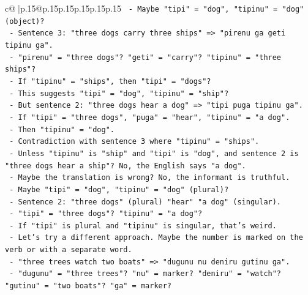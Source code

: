 \documentclass{article}
\begin{document}
{\begin{supertabular}{c@{$\;$}|p{.15\linewidth}@{}p{.15\linewidth}p{.15\linewidth}p{.15\linewidth}p{.15\linewidth}p{.15\linewidth}}
{{{\texttt{                          {-} Maybe "tipi" = "dog", "tipinu" = "dog" (object)?} \\
\texttt{                          {-} Sentence 3: "three dogs carry three ships" => "pirenu ga geti tipinu ga".} \\
\texttt{                            {-} "pirenu" = "three dogs"? "geti" = "carry"? "tipinu" = "three ships"?} \\
\texttt{                            {-} If "tipinu" = "ships", then "tipi" = "dogs"?} \\
\texttt{                            {-} This suggests "tipi" = "dog", "tipinu" = "ship"?} \\
\texttt{                            {-} But sentence 2: "three dogs hear a dog" => "tipi puga tipinu ga".} \\
\texttt{                              {-} If "tipi" = "three dogs", "puga" = "hear", "tipinu" = "a dog".} \\
\texttt{                              {-} Then "tipinu" = "dog".} \\
\texttt{                              {-} Contradiction with sentence 3 where "tipinu" = "ships".} \\
\texttt{                              {-} Unless "tipinu" is "ship" and "tipi" is "dog", and sentence 2 is "three dogs hear a ship"? No, the English says "a dog".} \\
\texttt{                              {-} Maybe the translation is wrong? No, the informant is truthful.} \\
\texttt{                              {-} Maybe "tipi" = "dog", "tipinu" = "dog" (plural)?} \\
\texttt{                              {-} Sentence 2: "three dogs" (plural) "hear" "a dog" (singular).} \\
\texttt{                                {-} "tipi" = "three dogs"? "tipinu" = "a dog"?} \\
\texttt{                                {-} If "tipi" is plural and "tipinu" is singular, that's weird.} \\
\texttt{                              {-} Let's try a different approach. Maybe the number is marked on the verb or with a separate word.} \\
\texttt{                              {-} "three trees watch two boats" => "dugunu nu deniru gutinu ga".} \\
\texttt{                                {-} "dugunu" = "three trees"? "nu" = marker? "deniru" = "watch"? "gutinu" = "two boats"? "ga" = marker?} \\
}}}
\end{supertabular}}
\end{document}
